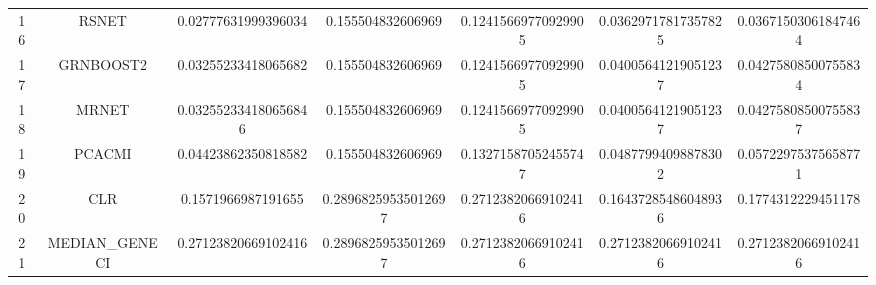 \documentclass[a4paper,10pt]{article}
\begin{document}
\begin{landscape}
\begin{table}[!htp]
\begin{tabular}{ccccccc}
16&RSNET&0.02777631999396034&0.155504832606969&0.12415669770929905&0.03629717817357825&0.03671503061847464\\
17&GRNBOOST2&0.03255233418065682&0.155504832606969&0.12415669770929905&0.04005641219051237&0.04275808500755834\\
18&MRNET&0.032552334180656846&0.155504832606969&0.12415669770929905&0.04005641219051237&0.04275808500755837\\
19&PCACMI&0.04423862350818582&0.155504832606969&0.13271587052455747&0.04877994098878302&0.05722975375658771\\
20&CLR&0.1571966987191655&0.28968259535012697&0.27123820669102416&0.16437285486048936&0.1774312229451178\\
21&MEDIAN_GENECI&0.27123820669102416&0.28968259535012697&0.27123820669102416&0.27123820669102416&0.27123820669102416\\
\hline
\end{tabular}
\end{table}


\newpage


\end{landscape}
\end{document}
